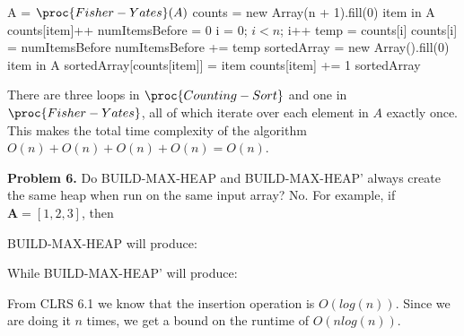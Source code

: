 \documentclass{article}
\begin{document}
\begin{codebox}
    \li A = $\proc{Fisher-Yates}(A)$
    \li
    \li counts = new Array(n + 1).fill(0)
    \li \For item in A \Do
    \li counts[item]++ \End
    \li
    \li numItemsBefore = 0
    \li \For i = 0; $i < n$; i++ \Do
    \li temp = counts[i]
    \li counts[i] = numItemsBefore
    \li numItemsBefore += temp \End
    \li
    \li sortedArray = new Array().fill(0)
    \li \For item in A \Do
    \li sortedArray[counts[item]] = item
    \li counts[item] += 1 \End
    \li
    \li \Return sortedArray
\end{codebox}

There are three loops in $\proc{Counting-Sort}$ and one in $\proc{Fisher-Yates}$, all of which iterate over each element in $A$ exactly once. This makes the total time complexity of the algorithm $O(n) + O(n) + O(n) + O(n) = O(n)$.

\hfill

\textbf{Problem 6.} Do BUILD-MAX-HEAP and BUILD-MAX-HEAP' always create the same heap when run on the same input array? No. For example, if $\pmb A = [1, 2, 3]$, then

BUILD-MAX-HEAP will produce:

\begin{center}
\end{center}

While BUILD-MAX-HEAP' will produce:

\begin{center}
\end{center}

From CLRS 6.1 \cite{CLRS} we know that the insertion operation is $O(log(n))$. Since we are doing it $n$ times, we get a bound on the runtime of $O(nlog(n))$.
\end{document}
